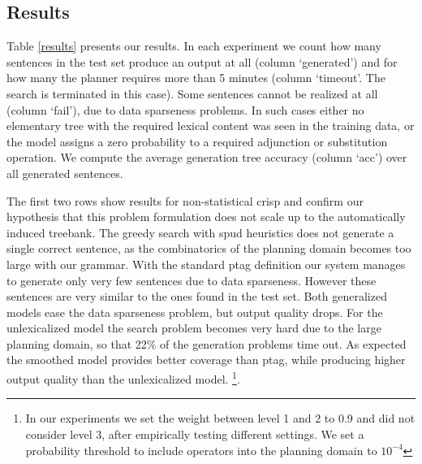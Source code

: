 \subsection{Results}
Table \ref{results} presents our results. In each experiment we count how many sentences in the test set produce an output at all (column `generated') and for how many the planner requires more than 5 minutes (column `timeout'. The search is terminated in this case). Some sentences cannot be realized at all (column `fail'), due to data sparseness problems. In such cases either no elementary tree with the required lexical content was seen in the training data, or the model assigns a zero probability to a required adjunction or substitution operation. We compute the average generation tree accuracy (column `acc') over all generated sentences.
 
The first two rows show results for non-statistical {\sc crisp} and confirm our hypothesis that this problem formulation does not scale up to the automatically induced treebank. The greedy search with {\sc spud} heuristics does not generate a single correct sentence, as the combinatorics of the planning domain becomes too large with our grammar. 
With the standard {\sc ptag} definition our system manages to generate only very few sentences due to data sparseness. However these sentences are very similar to the ones found in the test set. Both generalized models ease the data sparseness problem, but output quality drops. For the unlexicalized model the search problem becomes very hard due to the large planning domain, so that 22\% of the generation problems time out. As expected the smoothed model provides better coverage than {\sc ptag}, while producing higher output quality than the unlexicalized model. 
\footnote{In our experiments we set the weight between level 1 and 2 to 0.9 and did not consider level 3, after empirically testing different settings. We set a probability threshold to include operators into the planning domain to $10^{-4}$}.

